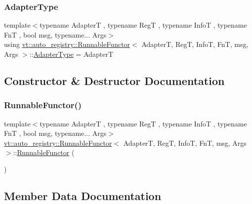 \subsubsection{\texorpdfstring{Adapter\+Type}{AdapterType}}
{\footnotesize\ttfamily template$<$typename AdapterT , typename RegT , typename InfoT , typename FnT , bool msg, typename... Args$>$ \\
using \hyperlink{structvt_1_1auto__registry_1_1_runnable_functor}{vt\+::auto\+\_\+registry\+::\+Runnable\+Functor}$<$ AdapterT, RegT, InfoT, FnT, msg, Args $>$\+::\hyperlink{structvt_1_1auto__registry_1_1_runnable_functor_a9453e4491db65054b10e21b12658b1bc}{Adapter\+Type} =  AdapterT}



\subsection{Constructor \& Destructor Documentation}
\mbox{\label{structvt_1_1auto__registry_1_1_runnable_functor_a4dee5a83ee53d3f6a309d28091cfd6ff}} 
\subsubsection{\texorpdfstring{Runnable\+Functor()}{RunnableFunctor()}}
{\footnotesize\ttfamily template$<$typename AdapterT , typename RegT , typename InfoT , typename FnT , bool msg, typename... Args$>$ \\
\hyperlink{structvt_1_1auto__registry_1_1_runnable_functor}{vt\+::auto\+\_\+registry\+::\+Runnable\+Functor}$<$ AdapterT, RegT, InfoT, FnT, msg, Args $>$\+::\hyperlink{structvt_1_1auto__registry_1_1_runnable_functor}{Runnable\+Functor} (\begin{DoxyParamCaption}{ }\end{DoxyParamCaption})\hspace{0.3cm}{\ttfamily [default]}}



\subsection{Member Data Documentation}
\mbox{\label{structvt_1_1auto__registry_1_1_runnable_functor_ad96ef115f3351bfe2e256f87d303e57a}} 
